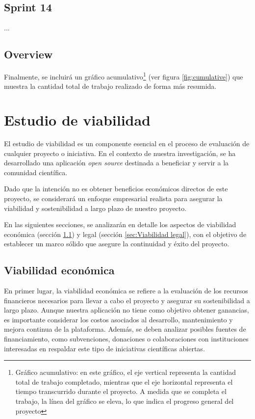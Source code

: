 
\subsection{Sprint 14}
...

\subsection{Overview}
Finalmente, se incluirá un gráfico acumulativo\footnote{Gráfico acumulativo: en este gráfico, el eje vertical representa la cantidad total de trabajo completado, mientras que el eje horizontal representa el tiempo transcurrido durante el proyecto. A medida que se completa el trabajo, la línea del gráfico se eleva, lo que indica el progreso general del proyecto} (ver figura \ref{fig:cumulative}) que muestra la cantidad total de trabajo realizado de forma más resumida.




\section{Estudio de viabilidad}
El estudio de viabilidad es un componente esencial en el proceso de evaluación de cualquier proyecto o iniciativa. En el contexto de nuestra investigación, se ha desarrollado una aplicación \textit{open source} destinada a beneficiar y servir a la comunidad científica. 

Dado que la intención no es obtener beneficios económicos directos de este proyecto, se considerará un enfoque empresarial realista para asegurar la viabilidad y sostenibilidad a largo plazo de nuestro proyecto.

En las siguientes secciones, se analizarán en detalle los aspectos de viabilidad económica (sección \ref{sec:Viabilidad económica}) y legal (sección \ref{sec:Viabilidad legal}), con el objetivo de establecer un marco sólido que asegure la continuidad y éxito del proyecto.

\subsection{Viabilidad económica}
\label{sec:Viabilidad económica}
En primer lugar, la viabilidad económica se refiere a la evaluación de los recursos financieros necesarios para llevar a cabo el proyecto y asegurar su sostenibilidad a largo plazo. Aunque nuestra aplicación no tiene como objetivo obtener ganancias, es importante considerar los costos asociados al desarrollo, mantenimiento y mejora continua de la plataforma. Además, se deben analizar posibles fuentes de financiamiento, como subvenciones, donaciones o colaboraciones con instituciones interesadas en respaldar este tipo de iniciativas científicas abiertas.

